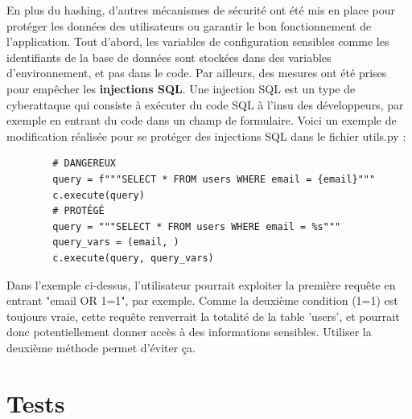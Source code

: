 \documentclass[french]{article}
\begin{document}
    En plus du hashing, d'autres mécanismes de sécurité ont été mis en place pour protéger les données des utilisateurs ou garantir le bon fonctionnement de l'application. Tout d'abord, les variables de configuration sensibles comme les identifiants de la base de données sont stockées dans des variables d'environnement, et pas dans le code. Par ailleurs, des mesures ont été prises pour empêcher les \textbf{injections SQL}. Une injection SQL est un type de cyberattaque qui consiste à exécuter du code SQL à l'insu des développeurs, par exemple en entrant du code dans un champ de formulaire. Voici un exemple de modification réalisée pour se protéger des injections  SQL dans le fichier utils.py :
    \begin{verbatim}
        # DANGEREUX
        query = f"""SELECT * FROM users WHERE email = {email}""" 
        c.execute(query)
        # PROTÉGÉ
        query = """SELECT * FROM users WHERE email = %s""" 
        query_vars = (email, )
        c.execute(query, query_vars)
    \end{verbatim}
    Dans l'exemple ci-dessus, l'utilisateur pourrait exploiter la première requête en entrant "email OR 1=1", par exemple. Comme la deuxième condition (1=1) est toujours vraie, cette requête renverrait la totalité de la table 'users', et pourrait donc potentiellement donner accès à des informations sensibles. Utiliser la deuxième méthode permet d'éviter ça.


    \section{Tests}
\end{document}
